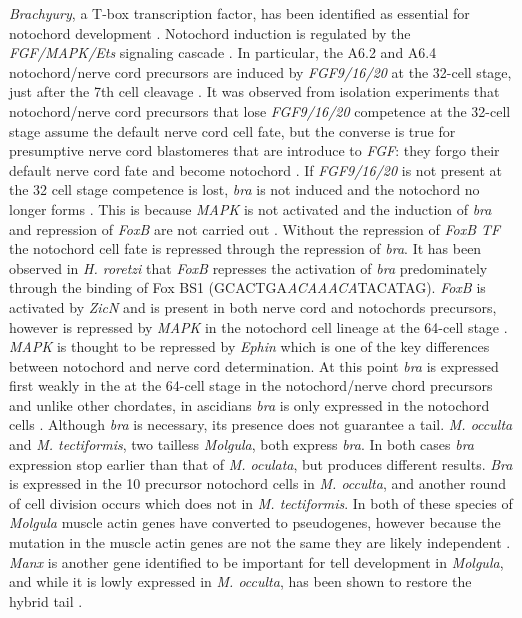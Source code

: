 \textit{Brachyury}, a T-box transcription factor, has been identified as essential for notochord development \cite{yasuo_conservation_1998}. Notochord induction is regulated by the \textit{FGF/MAPK/Ets} signaling cascade \cite{minokawa_binary_2001}. In particular, the A6.2 and A6.4 notochord/nerve cord precursors are induced by \textit{FGF9/16/20} at the 32-cell stage, just after the 7th cell cleavage \cite{satoh_ascidian_2001}. It was observed from isolation experiments that notochord/nerve cord precursors that lose \textit{FGF9/16/20} competence at the 32-cell stage assume the default nerve cord cell fate, but the converse is true for presumptive nerve cord blastomeres that are introduce to \textit{FGF}: they forgo their default nerve cord fate and become notochord \cite{yasuo_conservation_1998,minokawa_binary_2001}. If \textit{FGF9/16/20} is not present at the 32 cell stage competence is lost, \textit{bra} is not induced and the notochord no longer forms \cite{nakatani_basic_1996,nakatani_duration_1999}. This is because \textit{MAPK} is not activated and the induction of \textit{bra} and repression of \textit{FoxB} are not carried out \cite{hashimoto_transcription_2011}. Without the repression of \textit{FoxB TF} the notochord cell fate is repressed through the repression of \textit{bra}. It has been observed in \textit{H. roretzi} that \textit{FoxB} represses the activation of \textit{bra} predominately through the binding of Fox BS1 (GCACTGA\textit{ACAAACA}TACATAG). \textit{FoxB} is activated by \textit{ZicN} and is present in both nerve cord and notochords precursors, however is repressed by \textit{MAPK} in the notochord cell lineage at the 64-cell stage \cite{hashimoto_transcription_2011}. \textit{MAPK} is thought to be repressed by \textit{Ephin} which is one of the key differences between notochord and nerve cord determination. At this point \textit{bra} is expressed first weakly in the at the 64-cell stage in the notochord/nerve chord precursors \cite{yasuo_ascidian_1994} and unlike other chordates, in ascidians \textit{bra} is only expressed in the notochord cells \cite{yasuo_function_1993,corbo_characterization_1997,hotta_temporal_1999,takada_brachyury_2002}. Although \textit{bra} is necessary, its presence does not guarantee a tail. \textit{M. occulta} and \textit{M. tectiformis}, two tailless \textit{Molgula}, both express \textit{bra}. In both cases \textit{bra} expression stop earlier than that of \textit{M. oculata}, but produces different results. \textit{Bra} is expressed in the 10 precursor notochord cells in \textit{M. occulta}, and another round of cell division occurs which does not in \textit{M. tectiformis}.  In both of these species of \textit{Molgula} muscle actin genes have converted to pseudogenes, however because the mutation in the muscle actin genes are not the same they are likely independent \cite{swalla_novel_1993,jeffery_evolution_1999}. \textit{Manx} is another gene identified to be important for tell development in \textit{Molgula}, and while it is lowly expressed in \textit{M. occulta}, has been shown to restore the hybrid tail \cite{swalla_requirement_1996, swalla_multigene_1999}. 
  
